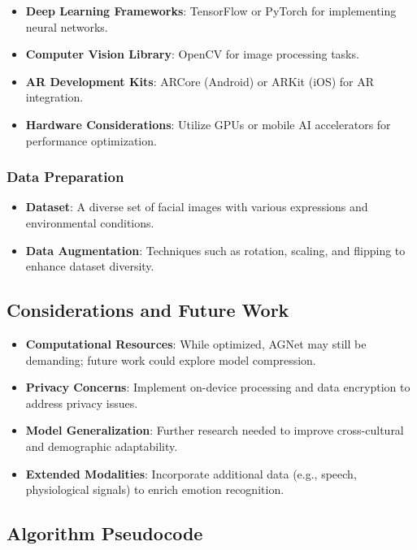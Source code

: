 \documentclass[lettersize,journal]{IEEEtran}
\begin{document}
\begin{itemize}
\item \textbf{Deep Learning Frameworks}: TensorFlow or PyTorch for implementing neural networks.
\item \textbf{Computer Vision Library}: OpenCV for image processing tasks.
\item \textbf{AR Development Kits}: ARCore (Android) or ARKit (iOS) for AR integration.
\item \textbf{Hardware Considerations}: Utilize GPUs or mobile AI accelerators for performance optimization.
\end{itemize}

\subsubsection{Data Preparation}

\begin{itemize}
\item \textbf{Dataset}: A diverse set of facial images with various expressions and environmental conditions.
\item \textbf{Data Augmentation}: Techniques such as rotation, scaling, and flipping to enhance dataset diversity.
\end{itemize}

\subsection{Considerations and Future Work}

\begin{itemize}
\item \textbf{Computational Resources}: While optimized, AGNet may still be demanding; future work could explore model compression.
\item \textbf{Privacy Concerns}: Implement on-device processing and data encryption to address privacy issues.
\item \textbf{Model Generalization}: Further research needed to improve cross-cultural and demographic adaptability.
\item \textbf{Extended Modalities}: Incorporate additional data (e.g., speech, physiological signals) to enrich emotion recognition.
\end{itemize}

\subsection{Algorithm Pseudocode}
\end{document}
